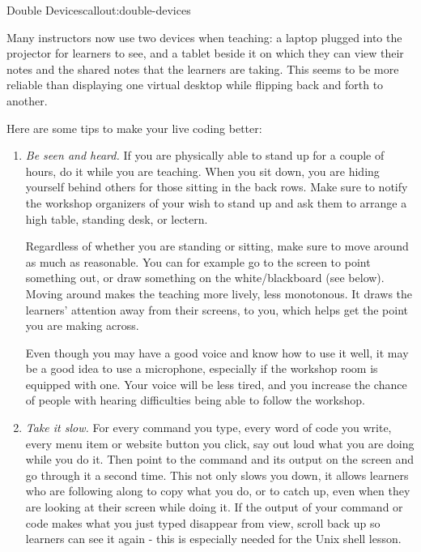 \begin{callout}{Double Devices}{callout:double-devices}

Many instructors now use two devices when teaching: a laptop plugged
into the projector for learners to see, and a tablet beside it on
which they can view their notes and the shared notes that the learners
are taking.  This seems to be more reliable than displaying one
virtual desktop while flipping back and forth to another.

\end{callout}

Here are some tips to make your live coding better:

\begin{enumerate}

\item
  \emph{Be seen and heard.}  If you are physically able to stand up
  for a couple of hours, do it while you are teaching. When you sit
  down, you are hiding yourself behind others for those sitting in the
  back rows. Make sure to notify the workshop organizers of your wish
  to stand up and ask them to arrange a high table, standing desk, or
  lectern.

  Regardless of whether you are standing or sitting, make sure to move
  around as much as reasonable. You can for example go to the screen
  to point something out, or draw something on the white/blackboard
  (see below). Moving around makes the teaching more lively, less
  monotonous.  It draws the learners' attention away from their
  screens, to you, which helps get the point you are making across.

  Even though you may have a good voice and know how to use it well,
  it may be a good idea to use a microphone, especially if the
  workshop room is equipped with one. Your voice will be less tired,
  and you increase the chance of people with hearing difficulties
  being able to follow the workshop.

\item
  \emph{Take it slow.}  For every command you type, every word of code
  you write, every menu item or website button you click, say out loud
  what you are doing while you do it. Then point to the command and
  its output on the screen and go through it a second time. This not
  only slows you down, it allows learners who are following along to
  copy what you do, or to catch up, even when they are looking at
  their screen while doing it. If the output of your command or code
  makes what you just typed disappear from view, scroll back up so
  learners can see it again - this is especially needed for the Unix
  shell lesson.


\end{enumerate}
